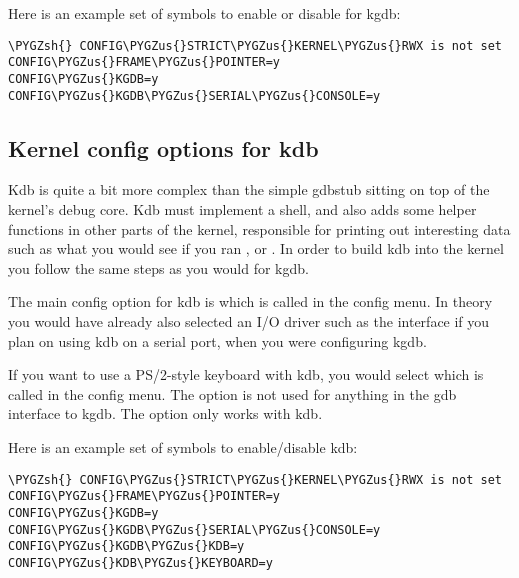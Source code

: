 \documentclass[a4paper,8pt,english]{sphinxmanual}
\def\PYGZus{\char`\_}
\def\PYGZsh{\char`\#}
\begin{document}
Here is an example set of  symbols to enable or disable for kgdb:

\begin{Verbatim}[commandchars=\\\{\}]
\PYGZsh{} CONFIG\PYGZus{}STRICT\PYGZus{}KERNEL\PYGZus{}RWX is not set
CONFIG\PYGZus{}FRAME\PYGZus{}POINTER=y
CONFIG\PYGZus{}KGDB=y
CONFIG\PYGZus{}KGDB\PYGZus{}SERIAL\PYGZus{}CONSOLE=y
\end{Verbatim}


\subsection{Kernel config options for kdb}
\label{dev-tools/kgdb:kernel-config-options-for-kdb}
Kdb is quite a bit more complex than the simple gdbstub sitting on top
of the kernel's debug core. Kdb must implement a shell, and also adds
some helper functions in other parts of the kernel, responsible for
printing out interesting data such as what you would see if you ran
, or . In order to build kdb into the kernel you follow the
same steps as you would for kgdb.

The main config option for kdb is  which is called
 in the config menu.
In theory you would have already also selected an I/O driver such as the
 interface if you plan on using kdb on a
serial port, when you were configuring kgdb.

If you want to use a PS/2-style keyboard with kdb, you would select
 which is called  in the config menu. The  option is not
used for anything in the gdb interface to kgdb. The 
option only works with kdb.

Here is an example set of  symbols to enable/disable kdb:

\begin{Verbatim}[commandchars=\\\{\}]
\PYGZsh{} CONFIG\PYGZus{}STRICT\PYGZus{}KERNEL\PYGZus{}RWX is not set
CONFIG\PYGZus{}FRAME\PYGZus{}POINTER=y
CONFIG\PYGZus{}KGDB=y
CONFIG\PYGZus{}KGDB\PYGZus{}SERIAL\PYGZus{}CONSOLE=y
CONFIG\PYGZus{}KGDB\PYGZus{}KDB=y
CONFIG\PYGZus{}KDB\PYGZus{}KEYBOARD=y
\end{Verbatim}
\end{document}
